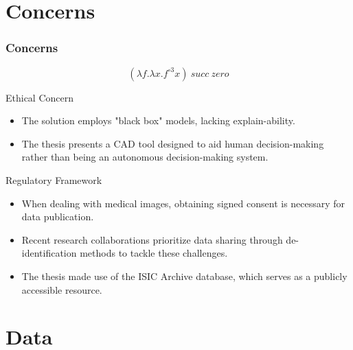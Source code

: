 \documentclass[dvipsnames,mathserif]{beamer}
\begin{document}
{\begin{frame}
    \end{frame}





    \section{Concerns}


    \begin{frame}
      \frametitle{Concerns}

      \[(\lambda f. \lambda x. f^{\circ 3} x)\ succ\ zero\]
    \end{frame}

    \begin{frame}
      \large Ethical Concern
      \vspace{0.25cm}

      \footnotesize
      \begin{itemize}
        \item The solution employs "black box" models, lacking explain-ability.
        \item The thesis presents a CAD tool designed to aid human decision-making
          rather than being an autonomous decision-making system.
      \end{itemize}
    \end{frame}

    \begin{frame}

      \large Regulatory Framework
      \vspace{0.25cm}

      \footnotesize

      \begin{itemize}
        \item When dealing with medical images, obtaining signed consent is
          necessary for data publication.
        \item Recent research collaborations prioritize data sharing through
          de-identification methods to tackle these challenges.
        \item The thesis made use of the ISIC Archive database, which serves as
          a publicly accessible resource.
      \end{itemize}


    \end{frame}



    \section{Data}

}
\end{document}
